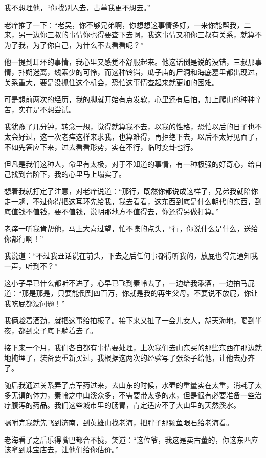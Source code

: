我不想理他，“你找别人去，古墓我更不想去。”

老痒推了一下：“老吴，你不够兄弟啊，你想想这事情多好，一来你能帮我，二来，另一边你三叔的事情你也得要查下去啊，我这事情又和你三叔有关系，就算不为了我，为了你自己，为什么不去看看呢？”

他一提到耳环的事情，我心里又感觉不舒服起来。他这话倒是说的没错，三叔那事情，扑朔迷离，线索少的可怜，而这种铃铛，瓜子庙的尸洞和海底墓里都出现过，关系重大，要是没抓住这个机会，恐怕这事情查起来就更加的困难。

可是想前两次的经历，我的脚就开始有点发软，心里还有后怕，加上爬山的种种辛苦，实在是不想尝试。

我犹豫了几分钟，转念一想，觉得就算我不去，以我的性格，恐怕以后的日子也不太会好过，这一次老痒这样来求我，也算难得，再拒绝下去，以后不太好见面了，不如先答应下来，过去看看形势，实在不行，临时变卦也行。

但凡是我们这种人，命里有太极，对于不知道的事情，有一种极强的好奇心，给自己找到台阶下，我的心里马上塌实了。

想着我就打定了注意，对老痒说道：“那行，既然你都说成这样了，兄弟我就陪你走一趟，不过你得把这耳环先给我，我去看看，这东西到底是什么朝代的东西，到底值钱不值钱，要不值钱，说明那地方不值得去，你还得另做打算。”

老痒一听我肯帮他，马上大喜过望，忙不喋的点头，“行，你说什么是什么，送给你都行啊！”

我说道：“不过我丑话说在前头，下去之后任何事都得听我的，放屁也得先通知我一声，听到不？”

这小子早已什么都听不进了，心早已飞到秦岭去了，一边给我添酒，一边拍马屁道：“那是那是，只要能倒到四百万，你就是我的再生父母。不要说不放屁，你让我吃屁都没问题！”

我俩趁着酒劲，就把这事给拍板了。接下来又扯了一会儿女人，胡天海地，喝到半夜，都到桌子底下躺着去了。

接下来一个月，我们各自都有事情要处理，上次我们去山东买的那些东西在那边就地掩埋了，装备要重新买过，我根据这两次的经验写了张条子给他，让他去办齐了。

随后我通过关系弄了点军药过来，去山东的时候，水壶的重量实在太重，消耗了太多无谓的体力，秦岭之中山溪众多，不需要带太多的水，但是很有必要准备一些治疗腹泻的药品。我们这些城市里的肠胃，肯定适应不了大山里的天然溪水。

嘱咐完我就先飞到济南，到英雄山找老海，把胖子那颗鱼眼石给老海看。

老海看了之后乐得嘴巴都合不拢，笑道：“这位爷，我这是卖古董的，你这东西应该拿到珠宝店去，让他们给你估价。”

